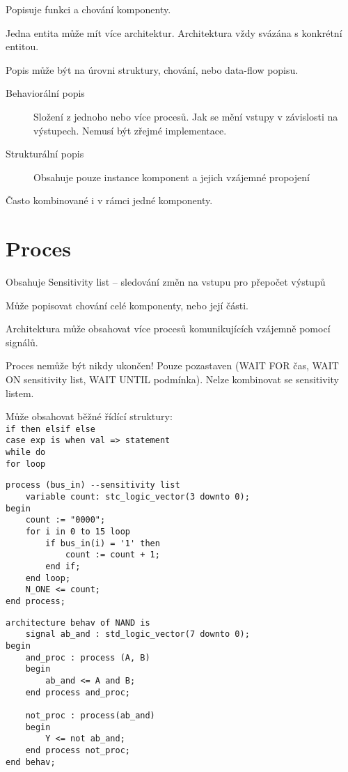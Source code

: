 \documentclass[a4wide]{report}
\begin{document}
Popisuje funkci a chování komponenty.

Jedna entita může mít více architektur. Architektura vždy svázána s konkrétní entitou.

Popis může být na úrovni struktury, chování, nebo data-flow popisu.

\begin{description}
	\item[Behaviorální popis] Složení z jednoho nebo více procesů. Jak se mění vstupy v závislosti na výstupech. Nemusí být zřejmé implementace.
	\item[Strukturální popis] Obsahuje pouze instance komponent a jejich vzájemné propojení
\end{description}

Často kombinované i v rámci jedné komponenty.

\section{Proces}

Obsahuje Sensitivity list -- sledování změn na vstupu pro přepočet výstupů

Může popisovat chování celé komponenty, nebo její části.

Architektura může obsahovat více procesů komunikujících vzájemně pomocí signálů.

Proces nemůže být nikdy ukončen! Pouze pozastaven (WAIT FOR čas, WAIT ON sensitivity list, WAIT UNTIL podmínka). Nelze kombinovat se sensitivity listem.

Může obsahovat běžné řídící struktury:\\
\verb|if then elsif else|\\
\verb|case exp is when val => statement|\\
\verb|while do| \\
\verb|for loop| \\

\lstset{caption=Jednoduchý příklad procesu}
\begin{lstlisting}
process (bus_in) --sensitivity list
	variable count: stc_logic_vector(3 downto 0);
begin
	count := "0000";
	for i in 0 to 15 loop
		if bus_in(i) = '1' then
			count := count + 1;
		end if;
	end loop;
	N_ONE <= count;
end process;
\end{lstlisting}

\begin{lstlisting}
architecture behav of NAND is
	signal ab_and : std_logic_vector(7 downto 0);
begin
	and_proc : process (A, B)
	begin
		ab_and <= A and B;
	end process and_proc;
	
	not_proc : process(ab_and)
	begin
		Y <= not ab_and;
	end process not_proc;
end behav;
\end{lstlisting}
\end{document}
